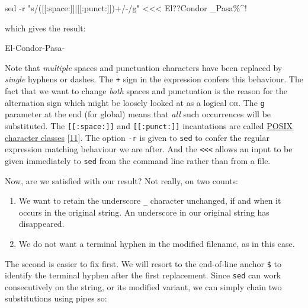 \documentclass[
  a4paper,
]{article}
\newenvironment{Shaded}{\begin{snugshade}}{\end{snugshade}}
\newcommand{\AttributeTok}[1]{\textcolor[rgb]{0.80,0.80,0.80}{#1}}
\newcommand{\FunctionTok}[1]{\textcolor[rgb]{0.94,0.94,0.56}{#1}}
\newcommand{\NormalTok}[1]{\textcolor[rgb]{0.80,0.80,0.80}{#1}}
\newcommand{\OperatorTok}[1]{\textcolor[rgb]{0.94,0.94,0.82}{#1}}
\newcommand{\StringTok}[1]{\textcolor[rgb]{0.80,0.58,0.58}{#1}}
\providecommand{\tightlist}{%
  \setlength{\itemsep}{0pt}\setlength{\parskip}{0pt}}
\begin{document}
\begin{Shaded}
\begin{Highlighting}[]
\FunctionTok{sed} \AttributeTok{{-}r} \StringTok{"s/([[:space:]]|[[:punct:]])+/{-}/g"} \OperatorTok{\textless{}\textless{}\textless{}} \StringTok{\textquotesingle{}El??Condor   \_Pasa\%\^{}!\textquotesingle{}}
\end{Highlighting}
\end{Shaded}

which gives the result:

\begin{Shaded}
\begin{Highlighting}[]
\NormalTok{El{-}Condor{-}Pasa{-}}
\end{Highlighting}
\end{Shaded}

Note that \emph{multiple} spaces and punctuation characters have been
replaced by \emph{single} hyphens or dashes. The \texttt{+} sign in the
expression confers this behaviour. The fact that we want to change
\emph{both} spaces and punctuation is the reason for the
\texttt{\textbar{}} alternation sign which might be loosely looked at as
a logical \textsc{or}. The \texttt{g} parameter at the end (for global)
means that \emph{all} such occurrences will be substituted. The
\texttt{{[}{[}:space:{]}{]}} and \texttt{{[}{[}:punct:{]}{]}}
incantations are called
\href{https://www.regular-expressions.info/posixbrackets.html}{POSIX
character classes} {[}\protect\hyperlink{ref-posixcharclass}{11}{]}. The
option \texttt{-r} is given to \texttt{sed} to confer the regular
expression matching behaviour we are after. And the
\texttt{\textless{}\textless{}\textless{}} allows an input to be given
immediately to \texttt{sed} from the command line rather than from a
file.

Now, are we satisfied with our result? Not really, on two counts:

\begin{enumerate}
\tightlist
\item
  We want to retain the underscore \texttt{\_} character unchanged, if
  and when it occurs in the original string. An underscore in our
  original string has disappeared.
\item
  We do not want a terminal hyphen in the modified filename, as in this
  case.
\end{enumerate}

The second is easier to fix first. We will resort to the end-of-line
anchor \texttt{\$} to identify the terminal hyphen after the first
replacement. Since \texttt{sed} can work consecutively on the string, or
its modified variant, we can simply chain two substitutions using pipes
so:
\end{document}
